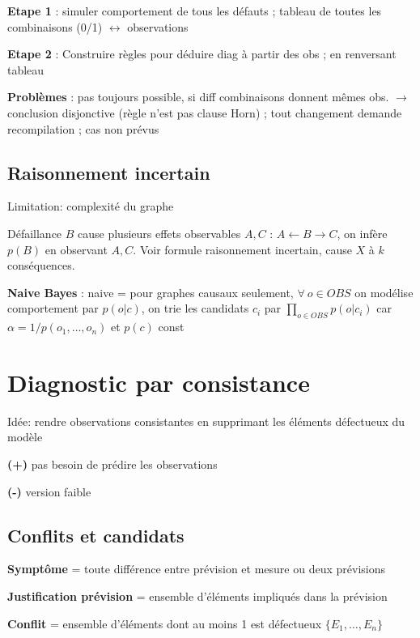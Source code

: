 \textbf{Etape 1} : simuler comportement de tous les défauts ; tableau de toutes les combinaisons (0/1) $\leftrightarrow$ observations 

\textbf{Etape 2} : Construire règles pour déduire diag à partir des obs ; en renversant tableau 

\textbf{Problèmes} : pas toujours possible, si diff combinaisons donnent mêmes obs. $\rightarrow$ conclusion disjonctive (règle n'est pas clause Horn) ; tout changement demande recompilation ; cas non prévus


\subsection*{Raisonnement incertain}

Limitation: complexité du graphe

Défaillance $B$ cause plusieurs effets observables $A, C$ : $A \leftarrow B \rightarrow C$, on infère $p(B)$ en observant $A, C$. Voir formule raisonnement incertain, cause $X$ à $k$ conséquences.

\textbf{Naive Bayes} : naive = pour graphes causaux seulement, $\forall \: o \in OBS$ on modélise comportement par $p(o|c)$, on trie les candidats $c_i$ par $\prod_{o\in OBS} p(o|c_i)$ car $\alpha = 1/p(o_1,\dots,o_n)$ et $p(c)$ const %



\section*{Diagnostic par consistance}

Idée: rendre observations consistantes en supprimant les éléments défectueux du modèle

\textbf{(+)} pas besoin de prédire les observations 

\textbf{(-)} version faible 


\subsection*{Conflits et candidats}

\textbf{Symptôme} = toute différence entre prévision et mesure ou deux prévisions

\textbf{Justification prévision} = ensemble d'éléments impliqués dans la prévision

\textbf{Conflit} = ensemble d'éléments dont au moins 1 est défectueux $\{E_1,\dots,E_n\}$

